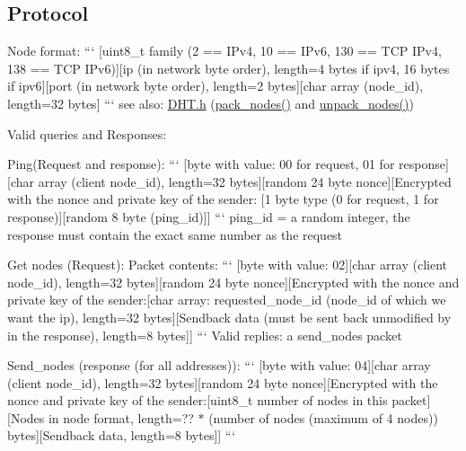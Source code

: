 \subsection*{Protocol }

Node format\+: ``` \mbox{[}uint8\+\_\+t family (2 == I\+Pv4, 10 == I\+Pv6, 130 == T\+C\+P I\+Pv4, 138 == T\+C\+P I\+Pv6)\mbox{]}\mbox{[}ip (in network byte order), length=4 bytes if ipv4, 16 bytes if ipv6\mbox{]}\mbox{[}port (in network byte order), length=2 bytes\mbox{]}\mbox{[}char array (node\+\_\+id), length=32 bytes\mbox{]} ``` see also\+: \hyperlink{_d_h_t_8h}{D\+H\+T.\+h} (\hyperlink{_d_h_t_8c_a1d6f2fcb008c989f333ae89e840f94b4}{pack\+\_\+nodes()} and \hyperlink{_d_h_t_8c_a45b33af842c0289c78c70f81e854ed62}{unpack\+\_\+nodes()})

Valid queries and Responses\+:

Ping(\+Request and response)\+: ``` \mbox{[}byte with value\+: 00 for request, 01 for response\mbox{]}\mbox{[}char array (client node\+\_\+id), length=32 bytes\mbox{]}\mbox{[}random 24 byte nonce\mbox{]}\mbox{[}Encrypted with the nonce and private key of the sender\+: \mbox{[}1 byte type (0 for request, 1 for response)\mbox{]}\mbox{[}random 8 byte (ping\+\_\+id)\mbox{]}\mbox{]} ``` ping\+\_\+id = a random integer, the response must contain the exact same number as the request

Get nodes (Request)\+: Packet contents\+: ``` \mbox{[}byte with value\+: 02\mbox{]}\mbox{[}char array (client node\+\_\+id), length=32 bytes\mbox{]}\mbox{[}random 24 byte nonce\mbox{]}\mbox{[}Encrypted with the nonce and private key of the sender\+:\mbox{[}char array\+: requested\+\_\+node\+\_\+id (node\+\_\+id of which we want the ip), length=32 bytes\mbox{]}\mbox{[}Sendback data (must be sent back unmodified by in the response), length=8 bytes\mbox{]}\mbox{]} ``` Valid replies\+: a send\+\_\+nodes packet

Send\+\_\+nodes (response (for all addresses))\+: ``` \mbox{[}byte with value\+: 04\mbox{]}\mbox{[}char array (client node\+\_\+id), length=32 bytes\mbox{]}\mbox{[}random 24 byte nonce\mbox{]}\mbox{[}Encrypted with the nonce and private key of the sender\+:\mbox{[}uint8\+\_\+t number of nodes in this packet\mbox{]}\mbox{[}Nodes in node format, length=?? $\ast$ (number of nodes (maximum of 4 nodes)) bytes\mbox{]}\mbox{[}Sendback data, length=8 bytes\mbox{]}\mbox{]} ``` 